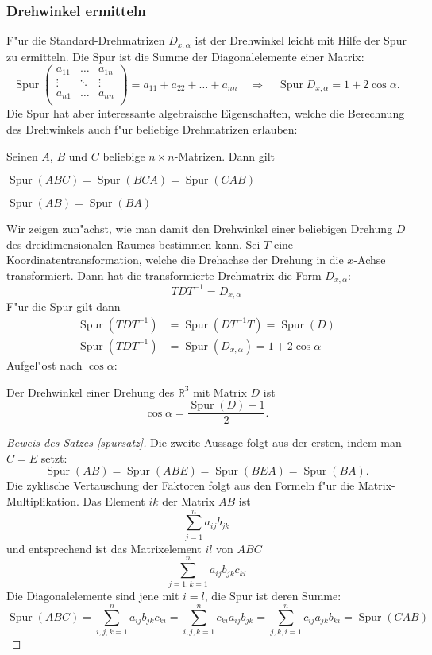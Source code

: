 \subsubsection{Drehwinkel ermitteln}
F"ur die Standard-Drehmatrizen $D_{x,\alpha}$ ist der Drehwinkel 
leicht mit Hilfe der Spur zu ermitteln.
Die Spur ist die Summe der
Diagonalelemente einer Matrix:
\[
\operatorname{Spur}
\begin{pmatrix}
a_{11}&\dots &a_{1n}\\
\vdots&\ddots&\vdots\\
a_{n1}&\dots &a_{nn}\\
\end{pmatrix}
=a_{11}+a_{22}+\dots+a_{nn}
\quad
\Rightarrow
\quad
\operatorname{Spur}D_{x,\alpha}=1+2\cos\alpha.
\]
Die Spur hat aber interessante algebraische Eigenschaften, welche
die Berechnung des Drehwinkels auch f"ur beliebige Drehmatrizen
erlauben:
\begin{satz}
\label{spursatz}
Seinen $A$, $B$ und $C$ beliebige $n\times n$-Matrizen.
Dann gilt
\begin{compactenum}
\item $\operatorname{Spur}(ABC)=\operatorname{Spur}(BCA)=\operatorname{Spur}(CAB)$
\item $\operatorname{Spur}(AB)=\operatorname{Spur}(BA)$
\end{compactenum}
\end{satz}
Wir zeigen zun"achst, wie man damit den Drehwinkel einer beliebigen
Drehung $D$ des dreidimensionalen Raumes bestimmen kann.
Sei $T$ eine Koordinatentransformation, welche die Drehachse der Drehung in die
$x$-Achse transformiert.
Dann hat die transformierte Drehmatrix die Form $D_{x,\alpha}$:
\[
TDT^{-1}= D_{x,\alpha}
\]
F"ur die Spur gilt dann
\begin{align*}
\operatorname{Spur}(TDT^{-1})
&=
\operatorname{Spur}(DT^{-1}T)
=
\operatorname{Spur}(D)
\\
\operatorname{Spur}(TDT^{-1})
&=
\operatorname{Spur}(D_{x,\alpha})=1+2\cos\alpha
\end{align*}
Aufgel"ost nach $\cos\alpha$:
\begin{satz}\label{drehwinkelsatz}
Der Drehwinkel einer Drehung des $\mathbb R^3$ mit Matrix $D$ ist
\[
\cos\alpha =\frac{\operatorname{Spur}(D) -1 }2.
\]
\end{satz}

\begin{proof}[Beweis des Satzes \ref{spursatz}]
Die zweite Aussage folgt aus der ersten, indem man $C=E$ setzt:
\[
\operatorname{Spur}(AB)=\operatorname{Spur}(ABE)=\operatorname{Spur}(BEA)=
\operatorname{Spur}(BA).
\]
Die zyklische Vertauschung der Faktoren folgt aus den Formeln f"ur die
Matrix-Multiplikation.
Das Element $ik$ der Matrix $AB$ ist
\[
\sum_{j=1}^na_{ij}b_{jk}
\]
und entsprechend ist das Matrixelement $il$ von $ABC$ 
\[
\sum_{j=1, k=1}^na_{ij}b_{jk}c_{kl}
\]
Die Diagonalelemente sind jene mit $i=l$, die Spur ist deren Summe:
\[
\operatorname{Spur}(ABC)
=\sum_{i,j,k=1}^na_{ij}b_{jk}c_{ki}
=\sum_{i,j,k=1}^nc_{ki}a_{ij}b_{jk}
=\sum_{j,k,i=1}^nc_{ij}a_{jk}b_{ki}
=\operatorname{Spur}(CAB)
\]
\end{proof}

